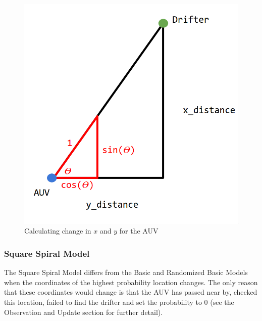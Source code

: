 \documentclass[a4paper, 11pt]{article} %
\begin{document}
\begin{figure}[H]
	\begin{center}
		\includegraphics[scale=0.20]{distance_calculation.png}
	\end{center}
\caption{Calculating change in $x$ and $y$ for the AUV \label{basicGeo1}}
\end{figure}

\subsubsection*{Square Spiral Model}

The Square Spiral Model differs from the Basic and Randomized Basic Models when the coordinates of the highest probability location changes. The only reason that these coordinates would change is that the AUV has passed near by, checked this location, failed to find the drifter and set the probability to 0 (see the Observation and Update section for further detail). 
\end{document}
